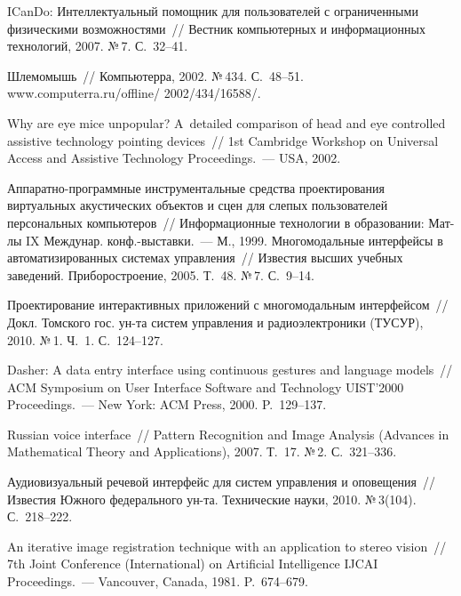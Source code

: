 \begin{multicols}{2}
{{\begin{thebibliography}{99}
  
ICanDo: Интеллектуальный помощник для пользователей с ограниченными 
физическими возможностями~// Вестник компьютерных и информационных 
технологий, 2007. №\,7. С.~32--41.

Шлемомышь~// Компьютерра, 2002. №\,434. С.~48--51. {\sf 
www.computerra.ru/offline/ 2002/434/16588/}.

Why are eye mice unpopular? A~detailed comparison of head and eye controlled 
assistive technology pointing devices~// 1st Cambridge Workshop on Universal 
Access and Assistive Technology Proceedings.~--- USA, 2002.

Ап\-па\-рат\-но-программные инструментальные средства проектирования 
виртуальных акустических объектов и сцен для слепых пользователей 
персональных компьютеров~// Информационные технологии в образовании: 
Мат-лы IX Междунар. конф.-выс\-тав\-ки.~--- М., 1999.
Многомодальные интерфейсы в автоматизированных системах управления~// 
Известия высших учебных заведений. Приборостроение, 2005. Т.~48. №\,7. 
С.~9--14.

Проектирование интерактивных приложений с многомодальным 
интерфейсом~// Докл. Томского гос. ун-та сис\-тем управ\-ле\-ния 
и радиоэлектроники (ТУСУР), 2010. №\,1. Ч.~1. С.~124--127.

Dasher: A data entry interface using continuous gestures and language models~// 
ACM Symposium on User Interface Software and Technology UIST'2000 
Proceedings.~--- New York: ACM Press, 2000. P.~129--137.

Russian voice interface~// Pattern Recognition and Image Analysis (Advances in 
Mathematical Theory and Applications), 2007. Т.~17. №\,2. С.~321--336.

Аудиовизуальный речевой интерфейс для систем управления и оповещения~// 
Известия Южного федерального ун-та. Технические науки, 2010. 
№\,3(104). С.~218--222.

An iterative image registration technique with an application to stereo vision~// 7th 
Joint Conference (International) on Artificial Intelligence \mbox{IJCAI} Proceedings.~--- 
Vancouver, Canada, 1981. P.~674--679.


\end{thebibliography}}}
\end{multicols}
